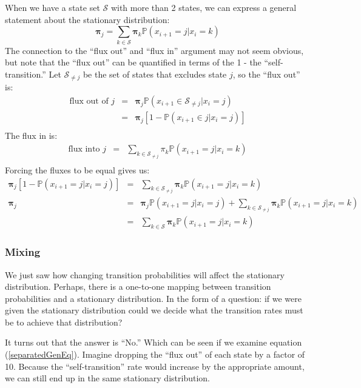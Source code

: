 \documentclass[11pt]{article}
\renewcommand{\Pr}{{\mathbb P}}
\begin{document}
When we have a state set $\mathcal{S}$ with more than 2 states, we can express a general statement about the stationary distribution:
\begin{equation}
	\bm\pi_j = \sum_{k\in \mathcal{S}}\bm\pi_{k}\Pr(x_{i+1} = j|x_{i} = k) \label{generalEquil}
\end{equation}
The connection to the ``flux out'' and ``flux in'' argument may not seem obvious, but note that the ``flux out'' can be 
quantified in terms of the 1 - the ``self-transition.''
Let $\mathcal{S}_{\neq j}$ be the set of states that excludes state $j$, so the ``flux out'' is:
\begin{eqnarray*}
	\mbox{flux out of } j & = & \bm\pi_j\Pr(x_{i+1}\in\mathcal{S}_{\neq j}|x_i=j) \\
	 & = &  \bm\pi_j\left[1 - \Pr(x_{i+1}\in j|x_i=j)\right]\\
\end{eqnarray*}
The flux in is:
\begin{eqnarray*}
	\mbox{flux into } j & = & \sum_{k\in \mathcal{S}_{\neq j}}\pi_{k}\Pr(x_{i+1} = j|x_{i} = k) \\
\end{eqnarray*}
Forcing the fluxes to be equal gives us:
\begin{eqnarray}
	\bm\pi_j\left[1 - \Pr(x_{i+1} =  j|x_i=j)\right] & = & \sum_{k\in \mathcal{S}_{\neq j}}\bm\pi_{k}\Pr(x_{i+1} = j|x_{i} = k) \nonumber \\
	\bm\pi_j & = &  \bm\pi_j\Pr(x_{i+1} =  j|x_i=j) + \sum_{k\in\mathcal{S}_{\neq j}}\bm \pi_{k}\Pr(x_{i+1} = j|x_{i} = k)    \label{separatedGenEq} \\
	& = & \sum_{k\in\mathcal{S}}\bm \pi_{k}\Pr(x_{i+1} = j|x_{i} = k) \nonumber
\end{eqnarray}



\subsubsection*{Mixing}
We just saw how changing transition probabilities will affect the stationary distribution. 
Perhaps, there is a one-to-one mapping between transition probabilities and a stationary distribution.
In the form of a question: if we were given the stationary distribution could we decide what the transition rates must be to achieve that distribution?

It turns out that the answer is ``No.''  
Which can be seen if we examine equation (\ref{separatedGenEq}).
Imagine dropping the ``flux out'' of each state by a factor of 10.
Because the ``self-transition'' rate would increase by the appropriate amount, we can still end up in the same stationary distribution.
\end{document}
